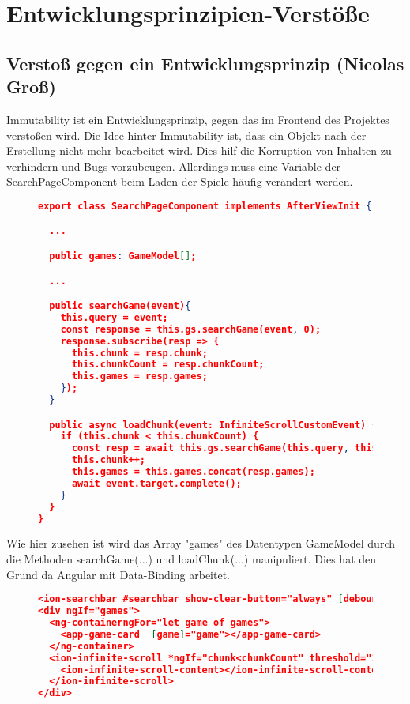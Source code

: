 
\section{Entwicklungsprinzipien-Verstöße}

\subsection*{Verstoß gegen ein Entwicklungsprinzip (Nicolas Groß)}

Immutability ist ein Entwicklungsprinzip, gegen das im Frontend des Projektes verstoßen wird. Die Idee hinter Immutability ist, dass ein Objekt nach der Erstellung nicht mehr bearbeitet wird. Dies hilf die Korruption von Inhalten zu verhindern und Bugs vorzubeugen.
Allerdings muss eine Variable der SearchPageComponent beim Laden der Spiele häufig verändert werden. 
\begin{figure}[bht]
\begin{lstlisting}[caption=Codeausschnitt der SearchPageComponent,language=json]
export class SearchPageComponent implements AfterViewInit {

  ...

  public games: GameModel[];

  ...

  public searchGame(event){
    this.query = event;
    const response = this.gs.searchGame(event, 0);
    response.subscribe(resp => {
      this.chunk = resp.chunk;
      this.chunkCount = resp.chunkCount;
      this.games = resp.games;
    });
  }

  public async loadChunk(event: InfiniteScrollCustomEvent) {
    if (this.chunk < this.chunkCount) {
      const resp = await this.gs.searchGame(this.query, this.chunk +1).toPromise();
      this.chunk++;
      this.games = this.games.concat(resp.games);
      await event.target.complete();
    }
  }
}
\end{lstlisting}
\end{figure}

Wie hier zusehen ist wird das Array "games" des Datentypen GameModel durch die Methoden searchGame(...) und loadChunk(...) manipuliert.
Dies hat den Grund da Angular mit Data-Binding arbeitet.

\begin{figure}[bht]
\begin{lstlisting}[caption=Codeausschnitt der SearchBar,language=json]
<ion-searchbar #searchbar show-clear-button="always" [debounce]="500" (ionChange)="this.searchGame($event)"></ion-searchbar>
<div ngIf="games">
  <ng-containerngFor="let game of games">
    <app-game-card  [game]="game"></app-game-card>
  </ng-container>
  <ion-infinite-scroll *ngIf="chunk<chunkCount" threshold="1000px" (ionInfinite)="loadChunk($event)">
    <ion-infinite-scroll-content></ion-infinite-scroll-content>
  </ion-infinite-scroll>
</div>
\end{lstlisting}
\end{figure}

